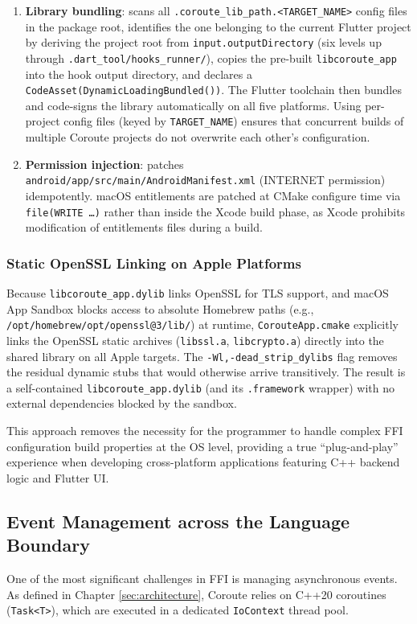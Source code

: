 \begin{enumerate}
    \item \textbf{Library bundling}: scans all \texttt{.coroute\_lib\_path.<TARGET\_NAME>} config files in the package root, identifies the one belonging to the current Flutter project by deriving the project root from \texttt{input.outputDirectory} (six levels up through \texttt{.dart\_tool/hooks\_runner/}), copies the pre-built \texttt{libcoroute\_app} into the hook output directory, and declares a \texttt{CodeAsset(DynamicLoadingBundled())}. The Flutter toolchain then bundles and code-signs the library automatically on all five platforms. Using per-project config files (keyed by \texttt{TARGET\_NAME}) ensures that concurrent builds of multiple Coroute projects do not overwrite each other's configuration.
    \item \textbf{Permission injection}: patches \texttt{android/app/src/main/AndroidManifest.xml} (INTERNET permission) idempotently. macOS entitlements are patched at CMake configure time via \texttt{file(WRITE \ldots)} rather than inside the Xcode build phase, as Xcode prohibits modification of entitlements files during a build.
\end{enumerate}

\subsubsection{Static OpenSSL Linking on Apple Platforms}
Because \texttt{libcoroute\_app.dylib} links OpenSSL for TLS support, and macOS App Sandbox blocks access to absolute Homebrew paths (e.g., \texttt{/opt/homebrew/opt/openssl@3/lib/}) at runtime, \texttt{CorouteApp.cmake} explicitly links the OpenSSL static archives (\texttt{libssl.a}, \texttt{libcrypto.a}) directly into the shared library on all Apple targets. The \texttt{-Wl,-dead\_strip\_dylibs} flag removes the residual dynamic stubs that would otherwise arrive transitively. The result is a self-contained \texttt{libcoroute\_app.dylib} (and its \texttt{.framework} wrapper) with no external dependencies blocked by the sandbox.

This approach removes the necessity for the programmer to handle complex FFI configuration build properties at the OS level, providing a true ``plug-and-play'' experience when developing cross-platform applications featuring C++ backend logic and Flutter UI.

\subsection{Event Management across the Language Boundary}
One of the most significant challenges in FFI is managing asynchronous events. As defined in Chapter \ref{sec:architecture}, Coroute relies on C++20 coroutines (\texttt{Task<T>}), which are executed in a dedicated \texttt{IoContext} thread pool.

